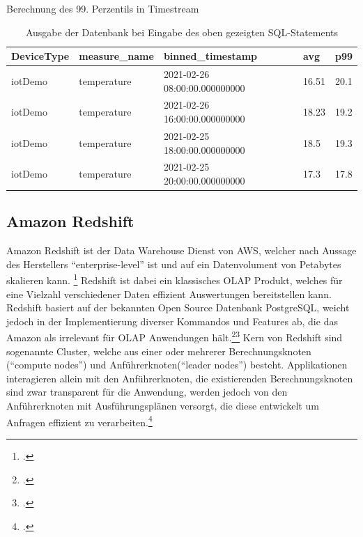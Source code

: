 \begin{listing}[H]
\inputminted[frame=lines,breaklines=true]{sql}{code/timestream-example.sql}
\caption{Berechnung des 99. Perzentils in Timestream}
\label{lst:sql-timestream}
\end{listing}

\begin{table}[H]
\centering
\begin{tabular}{|l|l|l|l|l|}
\hline
DeviceType & measure\_name & binned\_timestamp & avg & p99 \\ \hline
iotDemo & temperature & 2021-02-26 08:00:00.000000000 & 16.51 & 20.1 \\ \hline
iotDemo & temperature & 2021-02-26 16:00:00.000000000 & 18.23 & 19.2 \\ \hline
iotDemo & temperature & 2021-02-25 18:00:00.000000000 & 18.5 & 19.3 \\ \hline
iotDemo & temperature & 2021-02-25 20:00:00.000000000 & 17.3 & 17.8 \\ \hline
\end{tabular}
\caption{Ausgabe der Datenbank bei Eingabe des oben gezeigten SQL-Statements}
\label{tab:AusgabeSQL}
\end{table}

\subsection{Amazon Redshift}
Amazon Redshift ist der Data Warehouse Dienst von \ac{AWS}, welcher nach Aussage des Herstellers \enquote{enterprise-level} ist und auf ein Datenvolument von Petabytes skalieren kann. \footcite[Vgl.][1]{AmazonWebServicesInc..o.J.g} Redshift ist dabei ein klassisches \ac{OLAP} Produkt, welches für eine Vielzahl verschiedener Daten effizient Auswertungen bereitstellen kann. Redshift basiert auf der bekannten Open Source Datenbank PostgreSQL, weicht jedoch in der Implementierung diverser Kommandos und Features ab, die das Amazon als irrelevant für \ac{OLAP} Anwendungen hält.\footcite[Vgl.][4]{AmazonWebServicesInc..o.J.g}\nzitat\footcite[Vgl.][428\psqq]{AmazonWebServicesInc..o.J.g} Kern von Redshift sind sogenannte Cluster, welche aus einer oder mehrerer Berechnungsknoten (\enquote{compute nodes}) und Anführerknoten(\enquote{leader nodes}) besteht. Applikationen interagieren allein mit den Anführerknoten, die existierenden Berechnungsknoten sind zwar transparent für die Anwendung, werden jedoch von den Anführerknoten mit Ausführungsplänen versorgt, die diese entwickelt um Anfragen effizient zu verarbeiten.\footcite[Vgl.][4]{AmazonWebServicesInc..o.J.g}


